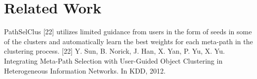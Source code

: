 \section{Related Work}

\cite{Zhu2016} \cite{sun2011pathsim} \cite{Sun:2012:HRP:2124295.2124373} \cite{huang2016meta}
\cite{wang2016relsim} \cite{sun2013pathselclus} \cite{sun2011ASONAM} \cite{Yang2012} \cite{liben2007link}


PathSelClus [22] utilizes limited guidance from users in the form of seeds in some of the clusters and automatically learn the best weights for each meta-path in the clustering process.
[22] Y. Sun, B. Norick, J. Han, X. Yan, P. Yu, X. Yu. Integrating Meta-Path Selection with User-Guided Object Clustering in
Heterogeneous Information Networks. In KDD, 2012.






